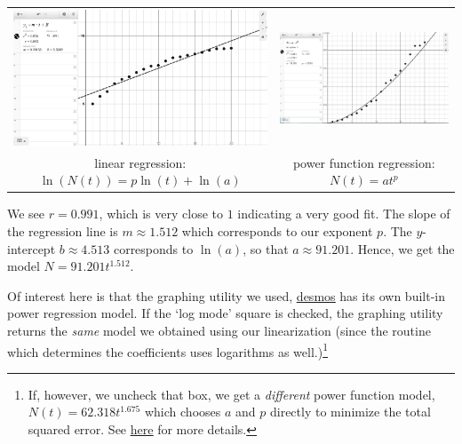 \begin{center}

\begin{tabular}{cc}

\includegraphics[width=3in]{./ApplicationsofExponentialandLogarithmicFunctionsGraphics/ExpLogAppEx10.jpg} &

\includegraphics[width=3in]{./ApplicationsofExponentialandLogarithmicFunctionsGraphics/ExpLogAppEx06a.jpg} \\

linear regression: $\ln(N(t)) = p \ln(t) + \ln(a)$ &

power function regression: $N(t) = at^{p}$ \\

\end{tabular}

\end{center}



We see $r=0.991$, which is very close to $1$ indicating a very good fit.   The slope of the regression line is $m \approx 1.512$ which corresponds to our exponent $p$.  The $y$-intercept $b \approx 4.513$ corresponds to $\ln(a)$, so that $a \approx 91.201$.  Hence, we get the model $N = 91.201 t^{1.512}$. 

\smallskip

Of interest here is that the graphing utility we used, \href{https://www.desmos.com}{\underline{desmos}} has its own built-in power regression model.  If the `log mode'  square is checked, the graphing utility returns the \textit{same} model we obtained using our linearization (since the routine which determines the coefficients uses logarithms as well.)\footnote{If, however, we uncheck that box, we get a \textit{different} power function model, $N(t) = 62.318 t^{1.675}$ which chooses $a$ and $p$ directly to minimize the total squared error.  See \href{http://support.desmos.com/hc/en-us/articles/204349605}{\underline{here}} for more details.}

